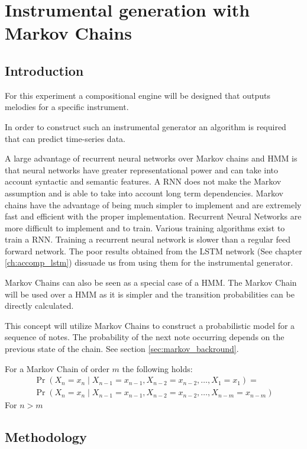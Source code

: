 \chapter{Instrumental generation with Markov Chains}
\section{Introduction}
For this experiment a compositional engine will be designed that outputs melodies for a specific instrument. 

In order to construct such an instrumental generator an algorithm is required that can predict time-series data.

A large advantage of recurrent neural networks over Markov chains and \ac{HMM} is that neural networks have greater representational power and can take into account syntactic and semantic features. A \ac{RNN} does not make the Markov assumption and is able to take into account long term dependencies.
Markov chains have the advantage of being much simpler to implement and are extremely fast and efficient with the proper implementation. 
Recurrent Neural Networks are more difficult to implement and to train. Various training algorithms exist to train a \ac{RNN}. Training a recurrent neural network is slower than a regular feed forward network. The poor results obtained from the \ac{LSTM} network (See chapter \ref{ch:accomp_lstm}) dissuade us from using them for the instrumental generator.

Markov Chains can also be seen as a special case of a \ac{HMM}. The Markov Chain will be used over a \ac{HMM} as it is simpler and the transition probabilities can be directly calculated.

This concept will utilize Markov Chains to construct a probabilistic model for a sequence of notes. The probability of the next note occurring depends on the previous state of the chain. See section \ref{sec:markov_backround}.

For a Markov Chain of order $m$ the following holds:
\begin{align}
\Pr(X_n=x_n\mid X_{n-1}=x_{n-1}, X_{n-2}=x_{n-2}, \dots , X_1=x_1) =
\\  \Pr(X_n=x_n\mid X_{n-1}=x_{n-1}, X_{n-2}=x_{n-2}, \dots, X_{n-m}=x_{n-m})
\end{align}
For $n > m$

\section{Methodology}
